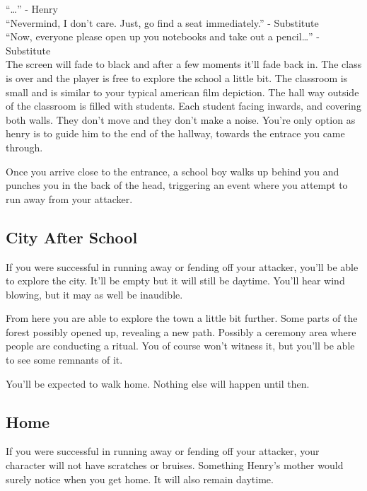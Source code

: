 \documentclass[12pt, a4paper, titlepage]{article}
\begin{document}
            ``\ldots'' - Henry
            \\

            ``Nevermind, I don't care. Just, go find a seat immediately.'' - Substitute
            \\

            ``Now, everyone please open up you notebooks and take out a pencil\ldots'' - Substitute
            \\

            The screen will fade to black and after a few moments it'll fade back in. The class is over and the player is free to explore
            the school a little bit. The classroom is small and is similar to your typical american film depiction. The hall way outside of the classroom
            is filled with students. Each student facing inwards, and covering both walls. They don't move and they don't make a noise. You're only option
            as henry is to guide him to the end of the hallway, towards the entrace you came through.

            Once you arrive close to the entrance, a school boy walks up behind you and punches you in the back of the head, triggering an event where you attempt
            to run away from your attacker.

        \subsection{City After School}

            If you were successful in running away or fending off your attacker, you'll be able to explore the city. It'll be empty but it will still be daytime. You'll hear wind blowing, but
            it may as well be inaudible.

            From here you are able to explore the town a little bit further. Some parts of the forest possibly opened up, revealing a new path. Possibly a ceremony area where people are
            conducting a ritual. You of course won't witness it, but you'll be able to see some remnants of it.

            You'll be expected to walk home. Nothing else will happen until then.

        \subsection{Home}

            If you were successful in running away or fending off your attacker, your character will not have scratches or bruises. Something Henry's mother would surely notice
            when you get home. It will also remain daytime.
            \\
\end{document}
